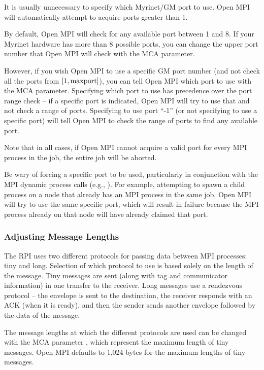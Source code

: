 It is usually unnecessary to specify which Myrinet/GM port to use.
Open MPI will automatically attempt to acquire ports greater than 1.

By default, Open MPI will check for any available port between 1 and 8.  If
your Myrinet hardware has more than 8 possible ports, you can change
the upper port number that Open MPI will check with the
 MCA parameter.

However, if you wish Open MPI to use a specific GM port number (and not
check all the ports from $[1, {\rm maxport}]$), you can tell Open MPI which
port to use with the  MCA parameter.
%
Specifying which port to use has precedence over the port range check
-- if a specific port is indicated, Open MPI will try to use that and not
check a range of ports.  Specifying to use port ``-1'' (or not
specifying to use a specific port) will tell Open MPI to check the range of
ports to find any available port.

Note that in all cases, if Open MPI cannot acquire a valid port for every
MPI process in the job, the entire job will be aborted.

Be wary of forcing a specific port to be used, particularly in
conjunction with the MPI dynamic process calls (e.g.,
).  For example, attempting to spawn a
child process on a node that already has an MPI process in the same
job, Open MPI will try to use the same specific port, which will result in
failure because the MPI process already on that node will have already
claimed that port.


\subsubsection{Adjusting Message Lengths}

The  RPI uses two different protocols for passing data between
MPI processes: tiny and long.  Selection of which protocol to use is
based solely on the length of the message.  Tiny messages are sent
(along with tag and communicator information) in one transfer to the
receiver.  Long messages use a rendezvous protocol -- the envelope is
sent to the destination, the receiver responds with an ACK (when it is
ready), and then the sender sends another envelope followed by the
data of the message.

The message lengths at which the different protocols are used can be
changed with the MCA parameter  ,
which represent the maximum length of tiny messages.  Open MPI defaults to
1,024 bytes for the maximum lengths of tiny messages.

